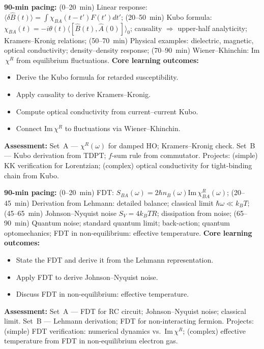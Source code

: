 \documentclass[11pt,a4paper]{article}
\begin{document}
\medskip

\begin{tcolorbox}[modulebox, title={Module~II.6 --- Lecture L03: Linear Response Theory and the Kubo Formula}]
\textbf{90-min pacing:} (0--20~min) Linear response: $\langle\delta\hat{B}(t)\rangle=\int\chi_{BA}(t-t')F(t')dt'$; (20--50~min) Kubo formula: $\chi_{BA}(t)=-i\theta(t)\langle[\hat{B}(t),\hat{A}(0)]\rangle_0$; causality $\Rightarrow$ upper-half analyticity; Kramers--Kronig relations; (50--70~min) Physical examples: dielectric, magnetic, optical conductivity; density--density response; (70--90~min) Wiener--Khinchin: Im$\,\chi^R$ from equilibrium fluctuations.
\medskip\textbf{Core learning outcomes:}
\begin{itemize}[leftmargin=1.4em,topsep=2pt,itemsep=1pt]
  \item Derive the Kubo formula for retarded susceptibility.
  \item Apply causality to derive Kramers--Kronig.
  \item Compute optical conductivity from current--current Kubo.
  \item Connect Im$\,\chi^R$ to fluctuations via Wiener--Khinchin.
\end{itemize}
\medskip\textbf{Assessment:}
Set~A --- $\chi^R(\omega)$ for damped HO; Kramers--Kronig check.
Set~B --- Kubo derivation from TDPT; $f$-sum rule from commutator.
Projects: (simple) KK verification for Lorentzian; (complex) optical conductivity for tight-binding chain from Kubo.
\end{tcolorbox}

\medskip

\begin{tcolorbox}[modulebox, title={Module~II.6 --- Lecture L04: The Fluctuation--Dissipation Theorem}]
\textbf{90-min pacing:} (0--20~min) FDT: $S_{BA}(\omega)=2\hbar n_B(\omega)\text{Im}\,\chi^R_{BA}(\omega)$; (20--45~min) Derivation from Lehmann: detailed balance; classical limit $\hbar\omega\ll k_BT$; (45--65~min) Johnson--Nyquist noise $S_V=4k_BTR$; dissipation from noise; (65--90~min) Quantum noise; standard quantum limit; back-action; quantum optomechanics; FDT in non-equilibrium: effective temperature.
\medskip\textbf{Core learning outcomes:}
\begin{itemize}[leftmargin=1.4em,topsep=2pt,itemsep=1pt]
  \item State the FDT and derive it from the Lehmann representation.
  \item Apply FDT to derive Johnson--Nyquist noise.
  \item Discuss FDT in non-equilibrium: effective temperature.
\end{itemize}
\medskip\textbf{Assessment:}
Set~A --- FDT for RC circuit; Johnson--Nyquist noise; classical limit.
Set~B --- Lehmann derivation; FDT for non-interacting fermion.
Projects: (simple) FDT verification: numerical dynamics vs.\ Im$\,\chi^R$; (complex) effective temperature from FDT in non-equilibrium electron gas.
\end{tcolorbox}
\end{document}
